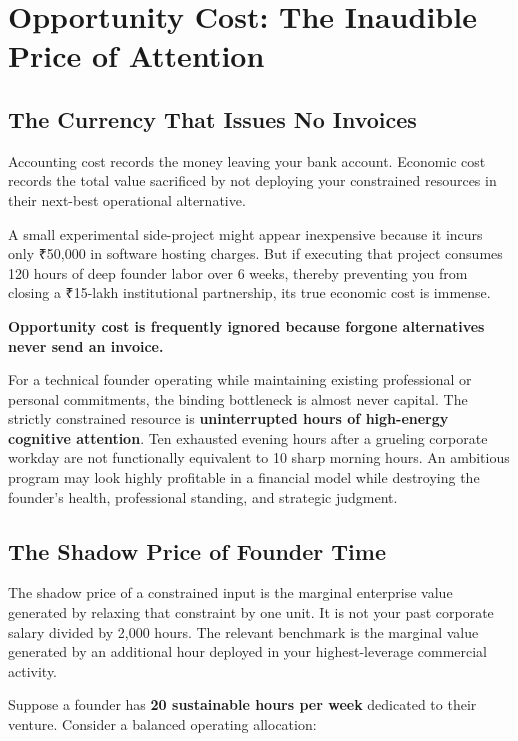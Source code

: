 \section{Opportunity Cost: The Inaudible Price of Attention}

\subsection{The Currency That Issues No Invoices}

Accounting cost records the money leaving your bank account. Economic cost records the total value sacrificed by not deploying your constrained resources in their next-best operational alternative.

A small experimental side-project might appear inexpensive because it incurs only ₹50,000 in software hosting charges. But if executing that project consumes 120 hours of deep founder labor over 6 weeks, thereby preventing you from closing a ₹15-lakh institutional partnership, its true economic cost is immense.

\textbf{Opportunity cost is frequently ignored because forgone alternatives never send an invoice.}

For a technical founder operating while maintaining existing professional or personal commitments, the binding bottleneck is almost never capital. The strictly constrained resource is \textbf{uninterrupted hours of high-energy cognitive attention}. Ten exhausted evening hours after a grueling corporate workday are not functionally equivalent to 10 sharp morning hours. An ambitious program may look highly profitable in a financial model while destroying the founder's health, professional standing, and strategic judgment.

\subsection{The Shadow Price of Founder Time}

The shadow price of a constrained input is the marginal enterprise value generated by relaxing that constraint by one unit. It is not your past corporate salary divided by 2,000 hours. The relevant benchmark is the marginal value generated by an additional hour deployed in your highest-leverage commercial activity.

Suppose a founder has \textbf{20 sustainable hours per week} dedicated to their venture. Consider a balanced operating allocation:

